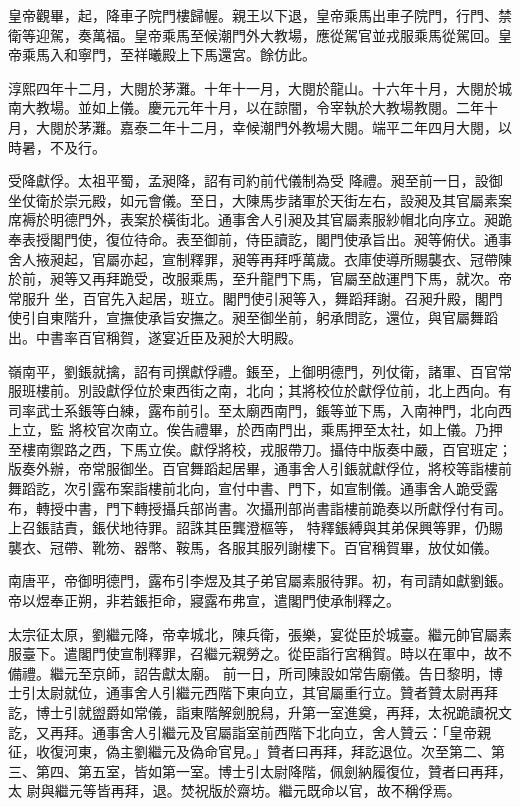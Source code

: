 \begin{pinyinscope}
 皇帝觀畢，起，降車子院門樓歸幄。親王以下退，皇帝乘馬出車子院門，行門、禁衛等迎駕，奏萬福。皇帝乘馬至候潮門外大教場，應從駕官並戎服乘馬從駕回。皇帝乘馬入和寧門，至祥曦殿上下馬還宮。餘仿此。



 淳熙四年十二月，大閱於茅灘。十年十一月，大閱於龍山。十六年十月，大閱於城南大教場。並如上儀。慶元元年十月，以在諒闇，令宰執於大教場教閱。二年十月，大閱於茅灘。嘉泰二年十二月，幸候潮門外教場大閱。端平二年四月大閱，以時暑，不及行。



 受降獻俘。太祖平蜀，孟昶降，詔有司約前代儀制為受
 降禮。昶至前一日，設御坐仗衛於崇元殿，如元會儀。至日，大陳馬步諸軍於天街左右，設昶及其官屬素案席褥於明德門外，表案於橫街北。通事舍人引昶及其官屬素服紗帽北向序立。昶跪奉表授閣門使，復位待命。表至御前，侍臣讀訖，閣門使承旨出。昶等俯伏。通事舍人掖昶起，官屬亦起，宣制釋罪，昶等再拜呼萬歲。衣庫使導所賜襲衣、冠帶陳於前，昶等又再拜跪受，改服乘馬，至升龍門下馬，官屬至啟運門下馬，就次。帝常服升
 坐，百官先入起居，班立。閣門使引昶等入，舞蹈拜謝。召昶升殿，閣門使引自東階升，宣撫使承旨安撫之。昶至御坐前，躬承問訖，還位，與官屬舞蹈出。中書率百官稱賀，遂宴近臣及昶於大明殿。



 嶺南平，劉鋹就擒，詔有司撰獻俘禮。鋹至，上御明德門，列仗衛，諸軍、百官常服班樓前。別設獻俘位於東西街之南，北向；其將校位於獻俘位前，北上西向。有司率武士系鋹等白練，露布前引。至太廟西南門，鋹等並下馬，入南神門，北向西上立，監
 將校官次南立。俟告禮畢，於西南門出，乘馬押至太社，如上儀。乃押至樓南禦路之西，下馬立俟。獻俘將校，戎服帶刀。攝侍中版奏中嚴，百官班定；版奏外辦，帝常服御坐。百官舞蹈起居畢，通事舍人引鋹就獻俘位，將校等詣樓前舞蹈訖，次引露布案詣樓前北向，宣付中書、門下，如宣制儀。通事舍人跪受露布，轉授中書，門下轉授攝兵部尚書。次攝刑部尚書詣樓前跪奏以所獻俘付有司。上召鋹詰責，鋹伏地待罪。詔誅其臣龔澄樞等，
 特釋鋹縛與其弟保興等罪，仍賜襲衣、冠帶、靴笏、器幣、鞍馬，各服其服列謝樓下。百官稱賀畢，放仗如儀。



 南唐平，帝御明德門，露布引李煜及其子弟官屬素服待罪。初，有司請如獻劉鋹。帝以煜奉正朔，非若鋹拒命，寢露布弗宣，遣閣門使承制釋之。



 太宗征太原，劉繼元降，帝幸城北，陳兵衛，張樂，宴從臣於城臺。繼元帥官屬素服臺下。遣閣門使宣制釋罪，召繼元親勞之。從臣詣行宮稱賀。時以在軍中，故不備禮。繼元至京師，詔告獻太廟。
 前一日，所司陳設如常告廟儀。告日黎明，博士引太尉就位，通事舍人引繼元西階下東向立，其官屬重行立。贊者贊太尉再拜訖，博士引就盥爵如常儀，詣東階解劍脫舄，升第一室進奠，再拜，太祝跪讀祝文訖，又再拜。通事舍人引繼元及官屬詣室前西階下北向立，舍人贊云：「皇帝親征，收復河東，偽主劉繼元及偽命官見。」贊者曰再拜，拜訖退位。次至第二、第三、第四、第五室，皆如第一室。博士引太尉降階，佩劍納履復位，贊者曰再拜，太
 尉與繼元等皆再拜，退。焚祝版於齋坊。繼元既命以官，故不稱俘焉。




\end{pinyinscope}
